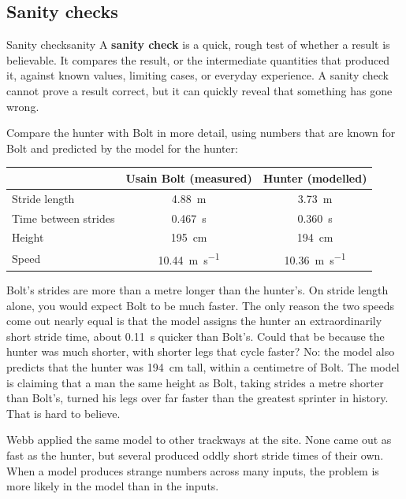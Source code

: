 \documentclass[11pt,twoside,openany]{book}
\newcounter{check}[chapter]
\begin{document}
\subsection{Sanity checks}

\begin{definition}{Sanity check}{sanity}
A \textbf{sanity check} is a quick, rough test of whether a result is believable. It compares the result, or the intermediate quantities that produced it, against known values, limiting cases, or everyday experience. A sanity check cannot prove a result correct, but it can quickly reveal that something has gone wrong.
\end{definition}

Compare the hunter with Bolt in more detail, using numbers that are known for Bolt and predicted by the model for the hunter:

\begin{center}
\renewcommand{\arraystretch}{1.2}
\begin{tabular}{lcc}
\toprule
 & Usain Bolt (measured) & Hunter (modelled) \\
\midrule
Stride length & \SI{4.88}{\metre} & \SI{3.73}{\metre} \\
Time between strides & \SI{0.467}{\second} & \SI{0.360}{\second} \\
Height & \SI{195}{\centi\metre} & \SI{194}{\centi\metre} \\
Speed & \SI{10.44}{\metre\per\second} & \SI{10.36}{\metre\per\second} \\
\bottomrule
\end{tabular}
\end{center}

Bolt's strides are more than a metre longer than the hunter's. On stride length alone, you would expect Bolt to be much faster. The only reason the two speeds come out nearly equal is that the model assigns the hunter an extraordinarily short stride time, about \SI{0.11}{\second} quicker than Bolt's. Could that be because the hunter was much shorter, with shorter legs that cycle faster? No: the model also predicts that the hunter was \SI{194}{\centi\metre} tall, within a centimetre of Bolt. The model is claiming that a man the same height as Bolt, taking strides a metre shorter than Bolt's, turned his legs over far faster than the greatest sprinter in history. That is hard to believe.

Webb applied the same model to other trackways at the site. None came out as fast as the hunter, but several produced oddly short stride times of their own. When a model produces strange numbers across many inputs, the problem is more likely in the model than in the inputs.
\end{document}
